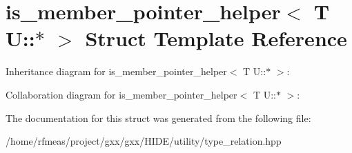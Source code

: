 \hypertarget{structis__member__pointer__helper_3_01T_01U_1_1_5_01_4}{}\section{is\+\_\+member\+\_\+pointer\+\_\+helper$<$ T U\+:\+:$\ast$ $>$ Struct Template Reference}
\label{structis__member__pointer__helper_3_01T_01U_1_1_5_01_4}


Inheritance diagram for is\+\_\+member\+\_\+pointer\+\_\+helper$<$ T U\+:\+:$\ast$ $>$\+:


Collaboration diagram for is\+\_\+member\+\_\+pointer\+\_\+helper$<$ T U\+:\+:$\ast$ $>$\+:


The documentation for this struct was generated from the following file\+:\begin{DoxyCompactItemize}
\item 
/home/rfmeas/project/gxx/gxx/\+H\+I\+D\+E/utility/type\+\_\+relation.\+hpp\end{DoxyCompactItemize}
